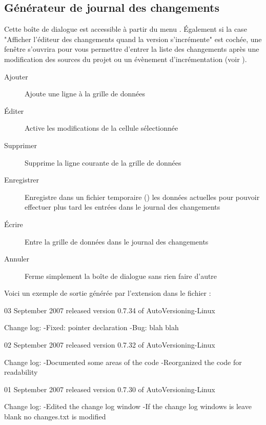 \subsection{Générateur de journal des changements}

Cette boîte de dialogue est accessible à partir du menu . Également si la case "Afficher l'éditeur des changements quand la version s'incrémente" est cochée, une fenêtre s'ouvrira pour vous permettre d'entrer la liste des changements après une modification des sources du projet ou un évènement d'incrémentation (voir ).



\begin{description}
\item[Ajouter] Ajoute une ligne à la grille de données
\item[Éditer] Active les modifications de la cellule sélectionnée
\item[Supprimer] Supprime la ligne courante de la grille de données
\item[Enregistrer] Enregistre dans un fichier temporaire () les données actuelles pour pouvoir effectuer plus tard les entrées dans le journal des changements
\item[Écrire] Entre la grille de données dans le journal des changements
\item[Annuler] Ferme simplement la boîte de dialogue sans rien faire d'autre
\end{description}

Voici un exemple de sortie générée par l'extension dans le fichier  :

\begin{code}
03 September 2007
   released version 0.7.34 of AutoVersioning-Linux

     Change log:
        -Fixed: pointer declaration
        -Bug: blah blah

02 September 2007
   released version 0.7.32 of AutoVersioning-Linux

     Change log:
        -Documented some areas of the code
        -Reorganized the code for readability

01 September 2007
   released version 0.7.30 of AutoVersioning-Linux

     Change log:
        -Edited the change log window
        -If the change log windows is leave blank no changes.txt is modified
\end{code}

